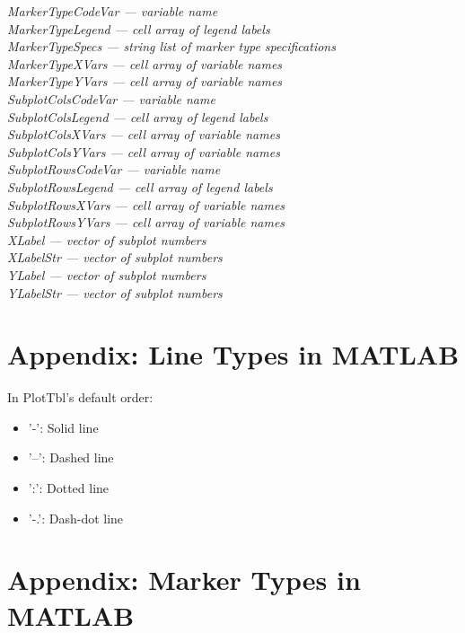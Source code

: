 \documentclass{article}
\newcommand{\namevalue}[2]{{\it #1 --- #2}}
\begin{document}
\namevalue{MarkerTypeCodeVar}{variable name} \\
\namevalue{MarkerTypeLegend}{cell array of legend labels} \\
\namevalue{MarkerTypeSpecs}{string list of marker type specifications} \\
\namevalue{MarkerTypeXVars}{cell array of variable names} \\
\namevalue{MarkerTypeYVars}{cell array of variable names} \\
\namevalue{SubplotColsCodeVar}{variable name} \\
\namevalue{SubplotColsLegend}{cell array of legend labels} \\
\namevalue{SubplotColsXVars}{cell array of variable names} \\
\namevalue{SubplotColsYVars}{cell array of variable names} \\
\namevalue{SubplotRowsCodeVar}{variable name} \\
\namevalue{SubplotRowsLegend}{cell array of legend labels} \\
\namevalue{SubplotRowsXVars}{cell array of variable names} \\
\namevalue{SubplotRowsYVars}{cell array of variable names} \\
\namevalue{XLabel}{vector of subplot numbers} \\
\namevalue{XLabelStr}{vector of subplot numbers} \\
\namevalue{YLabel}{vector of subplot numbers} \\
\namevalue{YLabelStr}{vector of subplot numbers}

\section{Appendix: Line Types in MATLAB}

In PlotTbl's default order:

\begin{itemize}
\item '-': Solid line
\item '--': Dashed line
\item ':': Dotted line
\item '-.': Dash-dot line
\end{itemize}

\section{Appendix: Marker Types in MATLAB}
\end{document}
